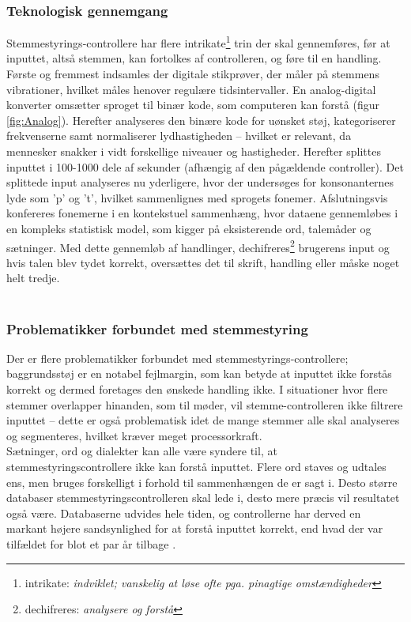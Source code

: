 \subsubsection{Teknologisk gennemgang}
Stemmestyrings-controllere har flere intrikate\footnote{intrikate: \textit{indviklet; vanskelig at løse ofte pga. pinagtige omstændigheder}\cite{DDOintrikate}} trin der skal gennemføres, før at inputtet, altså stemmen, kan fortolkes af controlleren, og føre til en handling. Første og fremmest indsamles der digitale stikprøver, der måler på stemmens vibrationer, hvilket måles henover regulære tidsintervaller. En analog-digital konverter omsætter sproget til binær kode, som computeren kan forstå (figur \ref{fig:Analog}). Herefter analyseres den binære kode for uønsket støj, kategoriserer frekvenserne samt normaliserer lydhastigheden – hvilket er relevant, da mennesker snakker i vidt forskellige niveauer og hastigheder. Herefter splittes inputtet i 100-1000 dele af sekunder (afhængig af den pågældende controller). Det splittede input analyseres nu yderligere, hvor der undersøges for konsonanternes lyde som ’p’ og ’t’, hvilket sammenlignes med sprogets fonemer. Afslutningsvis konfereres fonemerne i en kontekstuel sammenhæng, hvor dataene gennemløbes i en kompleks statistisk model, som kigger på eksisterende ord, talemåder og sætninger. Med dette gennemløb af handlinger, dechifreres\footnote{dechifreres: \textit{analysere og forstå}\cite{DDOdechifrere}} brugerens input og hvis talen blev tydet korrekt, oversættes det til skrift, handling eller måske noget helt tredje\cite{SpeechMIT}.\\\\

\subsubsection{Problematikker forbundet med stemmestyring}
\label{sec:problemer_med_stemmestyring}
Der er flere problematikker forbundet med stemmestyrings-controllere; baggrundsstøj er en notabel fejlmargin, som kan betyde at inputtet ikke forstås korrekt og dermed foretages den ønskede handling ikke. I situationer hvor flere stemmer overlapper hinanden, som til møder, vil stemme-controlleren ikke filtrere inputtet – dette er også problematisk idet de mange stemmer alle skal analyseres og segmenteres, hvilket kræver meget processorkraft.\\
Sætninger, ord og dialekter kan alle være syndere til, at stemmestyringscontrollere ikke kan forstå inputtet. Flere ord staves og udtales ens, men bruges forskelligt i forhold til sammenhængen de er sagt i. Desto større databaser stemmestyringscontrolleren skal lede i, desto mere præcis vil resultatet også være. Databaserne udvides hele tiden, og controllerne har derved en markant højere sandsynlighed for at forstå inputtet korrekt, end hvad der var tilfældet for blot et par år tilbage \cite{SpeechMIT}\cite{SpeechHowStuffWorks}.